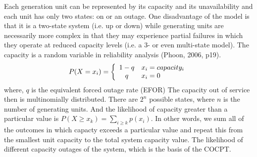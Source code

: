 \documentclass[10pt]{amsart}
\begin{document}
	Each generation unit can be represented by its capacity and its unavailability and each unit has only two states: on or an outage. 
	One disadvantage of the model is that it is a two-state system (i.e. up or down) while generating units are necessarily more complex in that they may experience partial failures in which they operate at reduced capacity levels (i.e. a 3- or even multi-state model).
	The capacity is a random variable in reliability analysis (Phoon, 2006, p19).
	\[
 	   P(X=x_i)=\left\{
             		   \begin{array}{c l}
             			   1-q & x_i = capacity_i \\
             			   q & x_i = 0
            		    \end{array}
         			\right.
	\]
	where, $q$ is the equivalent forced outage rate (EFOR)
	The capacity out of service then is multinomially distributed. 
	There are $2^n$ possible states, where $n$ is the number of generating units.
	And the likelihood of capacity greater than a particular value is $P(X \geq x_k) = \sum_{i \geq k} p(x_i)$.
	In other words, we sum all of the outcomes in which capacty exceeds a particular value and repeat this from the smallest unit capacity to the total system capacity value.  
	The likelihood of different capacity outages of the system, which is the basis of the COCPT. 			
	

\printbibliography
\end{document}
